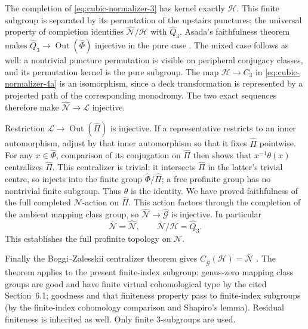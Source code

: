 The completion of \eqref{eq:cubic-normalizer-3} has kernel exactly $\mathcal H$. This finite
subgroup is separated by its permutation of the upstairs
punctures; the universal property of completion identifies
$\widehat{\mathcal N}/\mathcal H$ with $\widehat Q_3$. Asada's faithfulness
theorem makes
$\widehat Q_3\to\operatorname{Out}(\widehat\Phi)$
injective in the pure case
\cite[introduction Theorem, p.~3, parts (i)--(ii)]{CubicAsada}.
The mixed case follows as well: a nontrivial puncture
permutation is visible on peripheral conjugacy classes,
and its permutation kernel is the pure subgroup. The map
$\mathcal H\to C_3$ in \eqref{eq:cubic-normalizer-4a} is an isomorphism, since a deck
transformation is represented by a projected path of the
corresponding monodromy. The two exact sequences therefore
make $\widehat{\mathcal N}\to\mathcal L$ injective.

Restriction $\mathcal L\to
\operatorname{Out}(\widehat\Pi)$ is injective. If a
representative restricts to an inner automorphism, adjust by
that inner automorphism so that it fixes $\widehat\Pi$
pointwise. For any $x\in\widehat\Phi$, comparison of its
conjugation on $\widehat\Pi$ then shows that
$x^{-1}\theta(x)$ centralizes $\widehat\Pi$.
This centralizer is trivial: it intersects $\widehat\Pi$
in the latter's trivial centre, so injects into the finite
group $\widehat\Phi/\widehat\Pi$; a free profinite group
has no nontrivial finite subgroup. Thus $\theta$ is the
identity. We have proved faithfulness of the full completed
$\mathcal N$-action on $\widehat\Pi$. This action factors through
the completion of the ambient mapping class group, so
$\widehat{\mathcal N}\to\widehat{\mathcal G}$ is injective. In particular
\begin{equation}\label{eq:cubic-normalizer-4}
\overline{\mathcal N}=\widehat{\mathcal N},\qquad
 \overline{\mathcal N}/\mathcal H=\widehat Q_3.
\end{equation}
This establishes the full profinite topology on $\mathcal N$.

Finally the Boggi--Zalesskii centralizer theorem gives
$C_{\widehat{\mathcal G}}(\mathcal H)=\overline{\mathcal N}$
\cite[Theorem~A(iii), p.~3; Section~6.1 and
Theorem~6.2(iii), pp.~16--17]{CubicBZ}.
The theorem applies to the present finite-index subgroup:
genus-zero mapping class groups are good and have finite
virtual cohomological type by the cited Section~6.1;
goodness and that finiteness property pass to finite-index
subgroups (by the finite-index cohomology comparison and
Shapiro's lemma). Residual finiteness is inherited as well.
Only finite $3$-subgroups are used.

